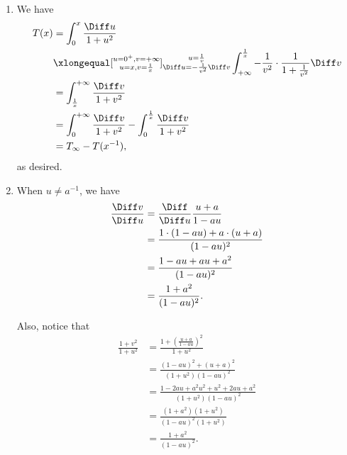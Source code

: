 \Question{\currfilebase}

\begin{enumerate}
    \item We have
          \begin{align*}
              T(x) & = \int_0^x \frac{\Diff u}{1 + u^2}                                                                                 \\
                   & \xlongequal[\substack{u=0^+, v=+\infty                                                                             \\
              u=x, v=\frac{1}{x}}]{\substack{u = \frac{1}{v}                                                                            \\
              \Diff u = - \frac{1}{v^2} \Diff v}} \int_{+\infty}^{\frac{1}{x}} -\frac{1}{v^2} \cdot \frac{1}{1 + \frac{1}{v^2}} \Diff v \\
                   & = \int_{\frac{1}{x}}^{+\infty} \frac{\Diff v}{1 + v^2}                                                             \\
                   & = \int_{0}^{+\infty} \frac{\Diff v}{1 + v^2} - \int_{0}^{\frac{1}{x}} \frac{\Diff v}{1 + v^2}                      \\
                   & = T_{\infty} - T(x^{-1}),
          \end{align*}
          as desired.

    \item When \(u \neq a^{-1}\), we have
          \begin{align*}
              \frac{\Diff v}{\Diff u} & = \frac{\Diff}{\Diff u} \frac{u+a}{1-au}          \\
                                      & = \frac{1 \cdot (1-au) + a \cdot (u+a)}{(1-au)^2} \\
                                      & = \frac{1 - au + au + a^2}{(1-au)^2}              \\
                                      & = \frac{1 + a^2}{(1-au)^2}.
          \end{align*}

          Also, notice that
          \begin{align*}
              \frac{1 + v^2}{1 + u^2} & = \frac{1 + \left(\frac{u + a}{1 - au}\right)^2}{1 + u^2}     \\
                                      & = \frac{(1-au)^2 + (u+a)^2}{(1+u^2) (1-au)^2}                 \\
                                      & = \frac{1 - 2au + a^2u^2 + u^2 + 2au + a^2}{(1+u^2) (1-au)^2} \\
                                      & = \frac{(1 + a^2) (1 + u^2)}{(1 - au)^2 (1 + u^2)}            \\
                                      & = \frac{1 + a^2}{(1 - au)^2}.
          \end{align*}


\end{enumerate}
